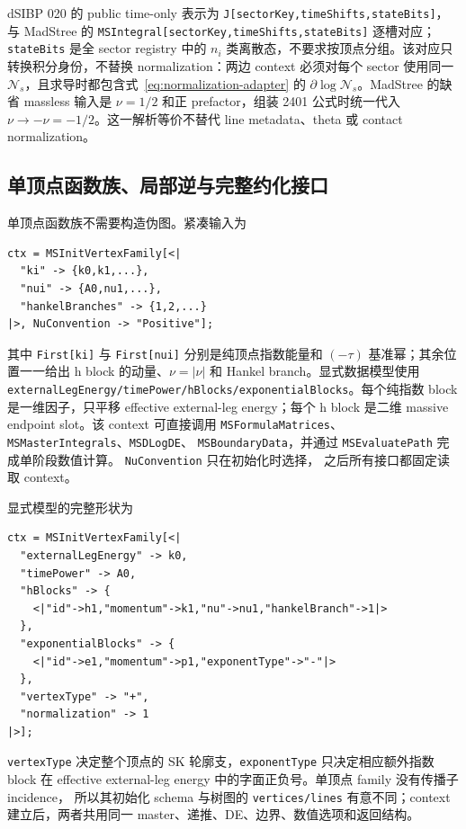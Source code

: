 \documentclass[11pt,a4paper]{ctexart}
\newcommand{\cN}{\mathcal N}
\begin{document}
dSIBP 020 的 public time-only 表示为 \texttt{J[sectorKey,timeShifts,stateBits]}，与 MadStree 的 \texttt{MSIntegral[sectorKey,timeShifts,stateBits]} 逐槽对应；\texttt{stateBits} 是全 sector registry 中的 $n_i$ 类离散态，不要求按顶点分组。该对应只转换积分身份，不替换 normalization：两边 context 必须对每个 sector 使用同一 $\cN_s$，且求导时都包含式~\eqref{eq:normalization-adapter} 的 $\partial\log\cN_s$。MadStree 的缺省 massless 输入是 $\nu=1/2$ 和正 prefactor，组装 2401 公式时统一代入 $\nu\to-\nu=-1/2$。这一解析等价不替代 line metadata、theta 或 contact normalization。

\subsection{单顶点函数族、局部逆与完整约化接口}

单顶点函数族不需要构造伪图。紧凑输入为
\begin{verbatim}
ctx = MSInitVertexFamily[<|
  "ki" -> {k0,k1,...},
  "nui" -> {A0,nu1,...},
  "hankelBranches" -> {1,2,...}
|>, NuConvention -> "Positive"];
\end{verbatim}
其中 \texttt{First[ki]} 与 \texttt{First[nui]} 分别是纯顶点指数能量和 $(-\tau)$
基准幂；其余位置一一给出 h block 的动量、$\nu=|\nu|$ 和 Hankel branch。显式数据模型使用
\texttt{externalLegEnergy/}\allowbreak\texttt{timePower/}\allowbreak\texttt{hBlocks/}\allowbreak\texttt{exponentialBlocks}。每个纯指数 block 是一维因子，只平移
effective external-leg energy；每个 h block 是二维 massive endpoint slot。该 context 可直接调用
\texttt{MSFormulaMatrices}、\texttt{MSMasterIntegrals}、\texttt{MSDLogDE}、
\texttt{MSBoundaryData}，并通过 \texttt{MSEvaluatePath} 完成单阶段数值计算。
\texttt{NuConvention} 只在初始化时选择，
之后所有接口都固定读取 context。

显式模型的完整形状为
\begin{verbatim}
ctx = MSInitVertexFamily[<|
  "externalLegEnergy" -> k0,
  "timePower" -> A0,
  "hBlocks" -> {
    <|"id"->h1,"momentum"->k1,"nu"->nu1,"hankelBranch"->1|>
  },
  "exponentialBlocks" -> {
    <|"id"->e1,"momentum"->p1,"exponentType"->"-"|>
  },
  "vertexType" -> "+",
  "normalization" -> 1
|>];
\end{verbatim}
\texttt{vertexType} 决定整个顶点的 SK 轮廓支，\texttt{exponentType} 只决定相应额外指数
block 在 effective external-leg energy 中的字面正负号。单顶点 family 没有传播子 incidence，
所以其初始化 schema 与树图的 \texttt{vertices/lines} 有意不同；context 建立后，两者共用同一
master、递推、DE、边界、数值选项和返回结构。
\end{document}
